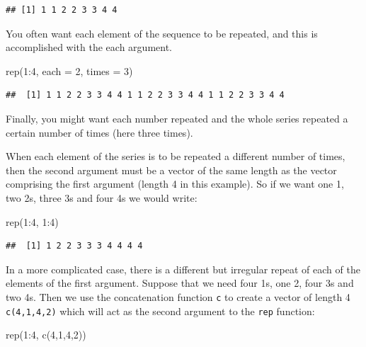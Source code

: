 \documentclass[
]{book}
\newenvironment{Shaded}{\begin{snugshade}}{\end{snugshade}}
\newcommand{\AttributeTok}[1]{\textcolor[rgb]{0.77,0.63,0.00}{#1}}
\newcommand{\DecValTok}[1]{\textcolor[rgb]{0.00,0.00,0.81}{#1}}
\newcommand{\FunctionTok}[1]{\textcolor[rgb]{0.00,0.00,0.00}{#1}}
\newcommand{\NormalTok}[1]{#1}
\newcommand{\SpecialCharTok}[1]{\textcolor[rgb]{0.00,0.00,0.00}{#1}}
\theoremstyle{definition}
\theoremstyle{definition}
\theoremstyle{definition}
\theoremstyle{definition}
\theoremstyle{remark}
\begin{document}
\begin{verbatim}
## [1] 1 1 2 2 3 3 4 4
\end{verbatim}

You often want each element of the sequence to be repeated, and this is accomplished with the each argument.

\begin{Shaded}
\begin{Highlighting}[]
\FunctionTok{rep}\NormalTok{(}\DecValTok{1}\SpecialCharTok{:}\DecValTok{4}\NormalTok{, }\AttributeTok{each =} \DecValTok{2}\NormalTok{, }\AttributeTok{times =} \DecValTok{3}\NormalTok{)}
\end{Highlighting}
\end{Shaded}

\begin{verbatim}
##  [1] 1 1 2 2 3 3 4 4 1 1 2 2 3 3 4 4 1 1 2 2 3 3 4 4
\end{verbatim}

Finally, you might want each number repeated and the whole series repeated a certain number of times (here three times).

When each element of the series is to be repeated a different number of times, then the second argument must be a vector of the same length as the vector comprising the first argument (length 4 in this example). So if we want one 1, two 2s, three 3s and four 4s we would write:

\begin{Shaded}
\begin{Highlighting}[]
\FunctionTok{rep}\NormalTok{(}\DecValTok{1}\SpecialCharTok{:}\DecValTok{4}\NormalTok{, }\DecValTok{1}\SpecialCharTok{:}\DecValTok{4}\NormalTok{)}
\end{Highlighting}
\end{Shaded}

\begin{verbatim}
##  [1] 1 2 2 3 3 3 4 4 4 4
\end{verbatim}

In a more complicated case, there is a different but irregular repeat of each of the elements of the first argument. Suppose that we need four 1s, one 2, four 3s and two 4s. Then we use the concatenation function \texttt{c} to create a vector of length 4 \texttt{c(4,1,4,2)} which will act as the second argument to the \texttt{rep} function:

\begin{Shaded}
\begin{Highlighting}[]
\FunctionTok{rep}\NormalTok{(}\DecValTok{1}\SpecialCharTok{:}\DecValTok{4}\NormalTok{, }\FunctionTok{c}\NormalTok{(}\DecValTok{4}\NormalTok{,}\DecValTok{1}\NormalTok{,}\DecValTok{4}\NormalTok{,}\DecValTok{2}\NormalTok{))}
\end{Highlighting}
\end{Shaded}
\end{document}
